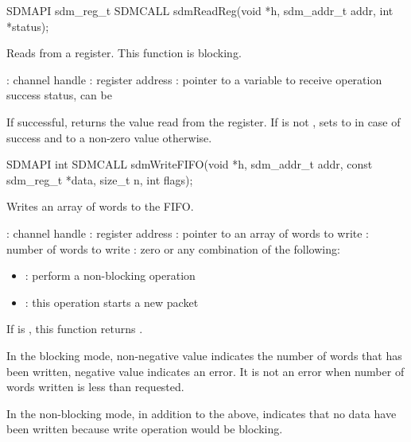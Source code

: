 \documentclass[a4paper,12pt,twoside,extrafontsizes]{memoir}
\begin{document}
\begin{cfuncprototype}
SDMAPI sdm_reg_t SDMCALL sdmReadReg(void *h, sdm_addr_t addr, int *status);
\end{cfuncprototype}

\begin{funcdescr}
	Reads from a register. This function is blocking.
\end{funcdescr}

\begin{funcparams}
	: channel handle
	: register address
	: pointer to a variable to receive operation success status, can be 
\end{funcparams}

\begin{funcret}
	If successful, returns the value read from the register. If  is not , sets  to  in case of success and to a non-zero value otherwise.
\end{funcret}



\begin{cfuncprototype}
SDMAPI int SDMCALL sdmWriteFIFO(void *h, sdm_addr_t addr, const sdm_reg_t *data, size_t n, int flags);
\end{cfuncprototype}

\begin{funcdescr}
	Writes an array of words to the FIFO.
\end{funcdescr}

\begin{funcparams}
	: channel handle
	: register address
	: pointer to an array of words to write
	: number of words to write
	: zero or any combination of the following:
		\begin{itemize}
			\item{}: perform a non-blocking operation
			\item{}: this operation starts a new packet
		\end{itemize}
\end{funcparams}

\begin{funcret}
	If  is , this function returns .
	
	In the blocking mode, non-negative value indicates the number of words that has been written, negative value indicates an error. It is not an error when number of words written is less than requested.
	
	In the non-blocking mode, in addition to the above,  indicates that no data have been written because write operation would be blocking.
\end{funcret}
\end{document}
